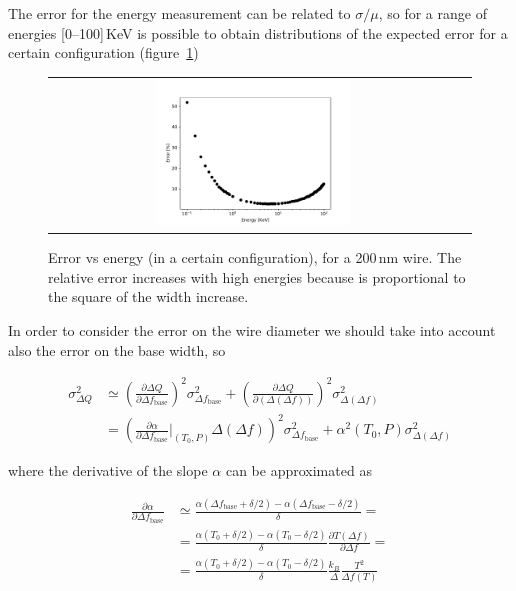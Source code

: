\documentclass[a4paper,12pt]{article}
\begin{document}
The error for the energy measurement can be related to $\sigma/\mu$, so for a range of energies [0--100]\,KeV is possible to obtain distributions of the expected error for a certain configuration (figure~\ref{fig:error})

\begin{figure}[!ht]
  \begin{center}
    \begin{tabular}{cc}
    \includegraphics[width=0.49\textwidth]{error_200nm}
    \end{tabular}
    \caption{Error vs energy (in a certain configuration), for a 200\,nm wire. The relative error increases with high energies because is proportional to the square of the width increase.}
    \label{fig:error}
  \end{center}
\end{figure}

In order to consider the error on the wire diameter we should take into account also the error on the base width, so

\begin{align}
  \sigma_{\Delta Q}^2 & \simeq \left( \frac{\partial \Delta Q}{\partial \Delta f_\mathrm{base}} \right)^2 \sigma_{\Delta f_\mathrm{base}}^2 
                             + \left( \frac{\partial \Delta Q}{\partial(\Delta(\Delta f))} \right)^2 \sigma_{\Delta (\Delta f)}^2  \\
                      & = \left( \frac{\partial \alpha}{\partial \Delta f_\mathrm{base}} \biggr\rvert_{(T_0,P)} \Delta(\Delta f )\right)^2 \sigma_{\Delta f_\mathrm{base}}^2
                        + \alpha^2(T_0,P) \sigma_{\Delta (\Delta f)}^2
\end{align}

where the derivative of the slope $\alpha$ can be approximated as

\begin{align}
  \frac{\partial \alpha}{\partial \Delta f_\mathrm{base}} & \simeq
  \frac{\alpha(\Delta f_\mathrm{base}+\delta/2) - \alpha(\Delta f_\mathrm{base}-\delta/2) }{\delta} = \\
       & = \frac{\alpha(T_0+\delta/2) - \alpha(T_0-\delta/2) }{\delta} \frac{\partial T(\Delta f)}{\partial \Delta f} = \\
       & = \frac{\alpha(T_0+\delta/2) - \alpha(T_0-\delta/2) }{\delta} \frac{k_B}{\varDelta} \frac{T^2}{\Delta f(T)}
\end{align}
\end{document}
